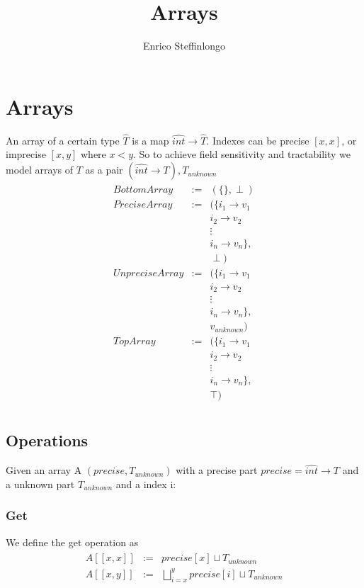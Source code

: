 \documentclass[10pt,a4paper,final]{article}
\author{Enrico Steffinlongo}
\title{Arrays}
\begin{document}
\maketitle
\section{Arrays}
An array of a certain type $\widehat{T}$ is a map $\widehat{int} \rightarrow \widehat{T}$. Indexes can be precise $[x,x]$, or imprecise $[x,y]$ where $x < y$. So to achieve field sensitivity and tractability we model arrays of $T$ as a pair $(\widehat{int} \rightarrow T), T_{unknown}$
\begin{align}
\begin{array}{rcl}
BottomArray &:=& (\{\}, \perp )\\
PreciseArray &:=& (\{ i_1 \rightarrow v_1 \\
&& i_2 \rightarrow v_2\\
&& \vdots\\
&& i_n \rightarrow v_n\},\\
&& \perp)\\
UnpreciseArray &:=& (\{ i_1 \rightarrow v_1 \\
&& i_2 \rightarrow v_2\\
&& \vdots\\
&& i_n \rightarrow v_n\},\\
&& v_{unknown})\\
TopArray &:=& (\{ i_1 \rightarrow v_1 \\
&& i_2 \rightarrow v_2\\
&& \vdots\\
&& i_n \rightarrow v_n\},\\
&& \top)\\
\end{array}
\end{align}

\subsection{Operations}
Given an array A $(precise, T_{unknown})$ with a precise part $precise = \widehat{int} \rightarrow T$ and a unknown part $T_{unknown}$ and a index i:
\subsubsection{Get}
We define the get operation as
\begin{align}
\begin{array}{rcl}
A[[x,x]] &:=& precise[x] \sqcup T_{unknown} \\
A[[x,y]] &:=& \bigsqcup_{i=x}^{y}precise[i] \sqcup T_{unknown} \\
\end{array}
\end{align}
\end{document}
